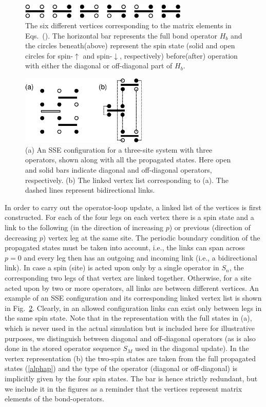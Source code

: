 \documentclass[10pt,pre,aps,twocolumn,showpacs,superscriptaddress,
floatfix]{revtex4}
\begin{document}
\begin{figure}
\includegraphics[clip,width=8cm]{fig1.eps}
\caption{The six different vertices corresponding to the matrix 
elements in Eqs.~(\protect{\ref{matrelem}}). The horizontal bar represents 
the full bond operator $H_b$ and the circles beneath(above) represent 
the spin state (solid and open circles for spin-$\uparrow$ and
spin-$\downarrow$, respectively) before(after) operation with either 
the diagonal or off-diagonal part of $H_b$.}
\label{vertices}
\end{figure}

\begin{figure}
\includegraphics[clip,width=6.0cm]{fig2.eps}
\caption{(a) An SSE configuration for a three-site system with three 
operators, shown along with all the propagated states. Here open and solid 
bars indicate diagonal and off-diagonal operators, respectively. (b) The 
linked vertex list corresponding to (a). The dashed lines represent 
bidirectional links.}
\label{linked}
\end{figure}

In order to carry out the operator-loop update, a linked list of the vertices 
is first constructed. For each of the four legs on each vertex there is a 
spin state and a link to the following (in the direction of increasing $p$) 
or previous (direction of decreasing $p$) vertex leg at the same site. The 
periodic boundary condition of the propagated states must be taken into 
account, i.e., the links can span across $p=0$ and every leg then has an 
outgoing and incoming link (i.e., a bidirectional link). In case a spin (site)
is acted upon only by a single operator in $S_n$, the corresponding two legs 
of that vertex are linked together. Otherwise, for a site acted upon by two 
or more operators, all links are between different vertices. An example of 
an SSE configuration and its corresponding linked vertex list is shown in 
Fig.~\ref{linked}. Clearly, in an allowed configuration links can exist
only between legs in the same spin state. Note that in the representation 
with the full states in (a), which is never used in the actual simulation but
is included here for illustrative purposes, we distinguish between diagonal 
and off-diagonal operators (as is also done in the stored operator sequence
$S_M$ used in the diagonal update). In the vertex representation (b) the 
two-spin states are taken from the full propagated states (\ref{alphap})
and the type of the operator (diagonal or off-diagonal) is implicitly given 
by the four spin states. The bar is hence strictly redundant, but we include 
it in the figures as a reminder that the vertices represent matrix elements 
of the bond-operators.
\end{document}
